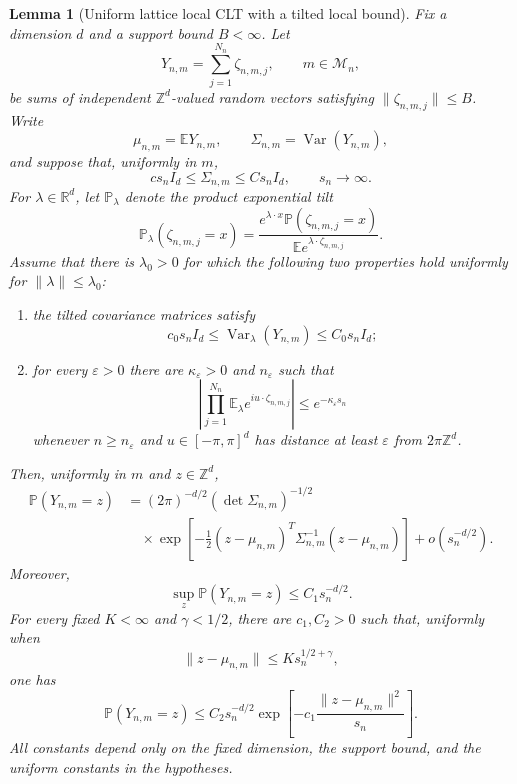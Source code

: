 \documentclass[11pt]{article}
\newtheorem{lemma}[theorem]{Lemma}
\theoremstyle{remark}
\newcommand{\Pp}{\mathbb P}
\newcommand{\Ee}{\mathbb E}
\newcommand{\Var}{\operatorname{Var}}
\begin{document}
\begin{lemma}[Uniform lattice local CLT with a tilted local bound]
\label{lem:llt}
Fix a dimension $d$ and a support bound $B<\infty$.  Let
\[
        Y_{n,m}=\sum_{j=1}^{N_n}\zeta_{n,m,j},
        \qquad m\in\mathcal M_n,
\]
be sums of independent $\mathbb Z^d$-valued random vectors satisfying
$\|\zeta_{n,m,j}\|\le B$.  Write
\[
        \mu_{n,m}=\Ee Y_{n,m},
        \qquad \Sigma_{n,m}=\Var(Y_{n,m}),
\]
and suppose that, uniformly in $m$,
\[
        c s_n I_d\le\Sigma_{n,m}\le C s_n I_d,
        \qquad s_n\longrightarrow\infty.
\]
For $\lambda\in\mathbb R^d$, let $\Pp_\lambda$ denote the product exponential
tilt
\[
 \Pp_\lambda(\zeta_{n,m,j}=x)
 =\frac{e^{\lambda\cdot x}\Pp(\zeta_{n,m,j}=x)}
 {\Ee e^{\lambda\cdot\zeta_{n,m,j}}}.
\]
Assume that there is $\lambda_0>0$ for which the following two properties hold
uniformly for $\|\lambda\|\le\lambda_0$:
\begin{enumerate}[label=(\roman*)]
\item the tilted covariance matrices satisfy
\[
        c_0s_nI_d\le\Var_\lambda(Y_{n,m})\le C_0s_nI_d;
\]
\item for every $\varepsilon>0$ there are $\kappa_\varepsilon>0$ and
$n_\varepsilon$ such that
\[
 \left|\prod_{j=1}^{N_n}
 \Ee_\lambda e^{iu\cdot\zeta_{n,m,j}}\right|
 \le e^{-\kappa_\varepsilon s_n}
\]
whenever $n\ge n_\varepsilon$ and
$u\in[-\pi,\pi]^d$ has distance at least $\varepsilon$ from
$2\pi\mathbb Z^d$.
\end{enumerate}
Then, uniformly in $m$ and $z\in\mathbb Z^d$,
\begin{align*}
 \Pp(Y_{n,m}=z)
 &=(2\pi)^{-d/2}(\det\Sigma_{n,m})^{-1/2}\\
 &\quad\times
 \exp\left[-\frac12(z-\mu_{n,m})^T
 \Sigma_{n,m}^{-1}(z-\mu_{n,m})\right]
 +o(s_n^{-d/2}).
\end{align*}
Moreover,
\[
        \sup_z\Pp(Y_{n,m}=z)\le C_1s_n^{-d/2}.
\]
For every fixed $K<\infty$ and $\gamma<1/2$, there are $c_1,C_2>0$ such
that, uniformly when
\[
        \|z-\mu_{n,m}\|\le K s_n^{1/2+\gamma},
\]
one has
\[
 \Pp(Y_{n,m}=z)
 \le C_2s_n^{-d/2}
 \exp\left[-c_1\frac{\|z-\mu_{n,m}\|^2}{s_n}\right].
\]
All constants depend only on the fixed dimension, the support bound, and the
uniform constants in the hypotheses.
\end{lemma}
\end{document}
